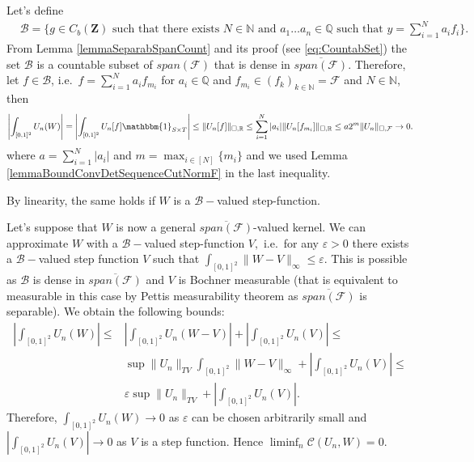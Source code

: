 \documentclass[11pt]{article}
\def\R{\mathbb{R}}
\def\N{\mathbb{N}}
\def\Q{\mathbb{Q}}
\newcommand{\cB}{{\mathcal B}}  %
\newcommand{\cF}{{\mathcal F}}  %
\newcommand{\Space}{\mathbf{Z}}
\newcommand{\CbFunct}{C_b(\Space)}
\begin{document}
Let's define
\begin{equation*}\begin{aligned}
&\cB=\{g\in  \CbFunct \text{ such that there exists } N\in\N \text{ and }a_1\ldots a_n\in \Q \text{ such that } y=\sum^N_{i=1}a_if_i\}.\end{aligned}\end{equation*}
From Lemma \ref{lemmaSeparabSpanCount} and its proof (see \eqref{eq:CountabSet}) the set $\cB$ is a countable subset of  $span(\cF)$ that is dense in $\overline{span(\cF)}.$ %
Therefore, let $f\in \cB$, i.e.\ $f=\sum^N_{i=1}a_if_{m_i}$ for $a_i\in \Q$ and $f_{m_i}\in (f_k)_{k\in \N}=\cF$ and $N\in \N$, then
$$\left|\int_{[0,1]^{2}}U_n(W)\right|=\left|\int_{[0,1]^{2}}U_n[f]\mathbbm{1}_{S\times T}\right|\leq \|U_n[f]\|_{\square,\R}\leq\sum^N_{i=1}|a_i| \|U_n[f_{m_i}]\|_{\square,\R}\leq a 2^m \|U_n\|_{\square,\cF}\rightarrow 0.$$
where $a=\sum^N_{i=1}|a_i|$ and $m=\max_{i\in [N]}\{m_i\}$ and we used Lemma \ref{lemmaBoundConvDetSequenceCutNormF} in the last inequality.

By linearity, the same holds if $W$ is a $\cB-$valued step-function.

Let's suppose that $W$ is now a general $\overline{span(\cF)}$-valued kernel. We can approximate $W$ with a $\cB-$valued step-function $V,$ i.e.\ for any $\varepsilon>0$ there exists a $\cB-$valued step function $V$ such that $\int_{[0,1]^2}\|W-V\|_{\infty}\leq \varepsilon.$ This is possible as $\cB$ is dense in $\overline{span(\cF)}$ and $V$ is Bochner measurable (that is equivalent to measurable in this case by Pettis measurability theorem as $\overline{span(\cF)}$ is separable).  We obtain the following bounds:
$$
\begin{aligned}
   \left|\int_{[0,1]^{2}}U_n(W)\right|\leq 
   &\left|\int_{[0,1]^{2}}U_n(W-V)\right|+\left|\int_{[0,1]^{2}}U_n(V)\right|\leq \\
   &\sup\|U_n\|_{TV}\int_{[0,1]^2}\|W-V\|_{\infty}+\left|\int_{[0,1]^{2}}U_n(V)\right|\leq \\
     & \varepsilon \sup\|U_n\|_{TV}+\left|\int_{[0,1]^{2}}U_n(V)\right|.
\end{aligned}$$
Therefore, $\int_{[0,1]^{2}}U_n(W)\rightarrow 0$ as $\varepsilon$ can be chosen arbitrarily small and $|\int_{[0,1]^{2}}U_n(V)|\rightarrow 0$ as $V$ is a step function. Hence $\liminf_n\mathcal{C}(U_n,W)=0.$ \newline
\end{document}
